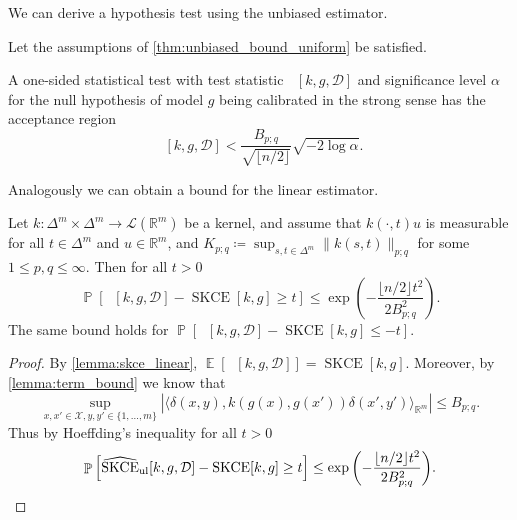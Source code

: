 \documentclass{article}
\DeclareMathOperator{\Prob}{\mathbb{P}}
\DeclareMathOperator{\Expect}{\mathbb{E}}
\DeclareMathOperator{\squaredkernelmeasure}{SKCE}
\DeclareMathOperator{\unbiasedestimator}{\widehat{SKCE}_{uq}}
\DeclareMathOperator{\linearestimator}{\widehat{SKCE}_{ul}}
\begin{document}
We can derive a hypothesis test using the unbiased estimator.

\begin{corollary}
  Let the assumptions of \cref{thm:unbiased_bound_uniform} be satisfied.

  A one-sided statistical test with test statistic
  $\unbiasedestimator[k, g, \mathcal{D}]$ and significance level
  $\alpha$ for the null hypothesis of model $g$ being calibrated in the strong
  sense has the acceptance region
  \begin{equation*}
    \unbiasedestimator[k, g, \mathcal{D}] < \frac{B_{p;q}}{\sqrt{\lfloor n / 2 \rfloor}} \sqrt{- 2\log{\alpha}}.
  \end{equation*}
\end{corollary}

Analogously we can obtain a bound for the linear estimator.

\begin{theorem}\label{thm:linear_bound_uniform}
  Let $k \colon \Delta^m \times \Delta^m \to \mathcal{L}(\mathbb{R}^m)$ be a
  kernel, and assume that $k(\cdot,t)u$ is measurable for all $t \in \Delta^m$
  and $u \in \mathbb{R}^m$, and
  $K_{p;q} \coloneqq \sup_{s,t \in \Delta^m} \|k(s,t)\|_{p;q}$ for some
  $1 \leq p,q \leq \infty$. Then for all $t > 0$
  \begin{equation*}
    \Prob\left[\linearestimator[k, g, \mathcal{D}] - \squaredkernelmeasure[k, g] \geq t \right] \leq \exp{\left(-\frac{\lfloor n / 2\rfloor t^2}{2 B_{p;q}^2}\right)}.
  \end{equation*}
  The same bound holds for
  $\Prob\left[\linearestimator[k, g, \mathcal{D}] - \squaredkernelmeasure[k, g] \leq -t \right]$.
\end{theorem}

\begin{proof}
  By \cref{lemma:skce_linear},
  $\Expect[\linearestimator[k, g, \mathcal{D}]] = \squaredkernelmeasure[k, g]$.
  Moreover, by \cref{lemma:term_bound} we know that
  \begin{equation*}
    \sup_{x,x' \in \mathcal{X}, y,y' \in \{1,\ldots,m\}} \left|\langle \delta(x,y), k(g(x),g(x')) \delta(x',y')\rangle_{\mathbb{R}^m} \right| \leq B_{p;q}.
  \end{equation*}
  Thus by Hoeffding's inequality
  \citep[Theorem~2]{hoeffding63_probab_inequal_sums_bound_random_variab} for all
  $t > 0$
  \begin{equation*}
    \Prob\left[\linearestimator[k, g, \mathcal{D}] - \squaredkernelmeasure[k, g] \geq t \right] \leq \exp{\left(-\frac{\lfloor n / 2\rfloor t^2}{2 B_{p;q}^2}\right)}. \qedhere
  \end{equation*}
\end{proof}
\end{document}
